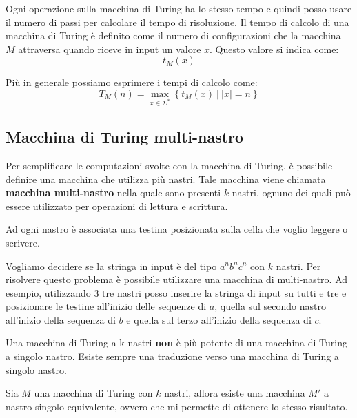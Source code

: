 Ogni operazione sulla macchina di Turing ha lo stesso tempo e quindi posso usare 
il numero di passi per calcolare il tempo di risoluzione. Il tempo di calcolo di 
una macchina di Turing è definito come il numero di configurazioni che la macchina
 $M$ attraversa quando riceve in input un valore $x$. Questo valore si indica come: 
\begin{equation}
    t_M(x)
\end{equation}

Più in generale possiamo esprimere i tempi di calcolo come:
\begin{equation}
    T_M(n) = \max_{x \in \Sigma^{\ast}} \left\{t_M(x) \ | \ |x| = n \right\}
\end{equation}
\subsection{Macchina di Turing multi-nastro}
Per semplificare le computazioni svolte con la macchina di Turing, è possibile 
definire una macchina che utilizza più nastri. Tale macchina viene chiamata 
\textbf{macchina multi-nastro} nella quale sono presenti $k$ nastri, ognuno dei 
quali può essere utilizzato per operazioni di lettura e scrittura.

Ad ogni nastro è associata una testina posizionata sulla cella che voglio leggere 
o scrivere. 

\begin{esempio} 
    Vogliamo decidere se la stringa in input è del tipo $a^nb^nc^n$ con $k$ nastri.
     Per risolvere questo problema è possibile utilizzare una macchina di multi-nastro. 
     Ad esempio, utilizzando 3 tre nastri posso inserire la stringa di input su tutti 
     e tre e posizionare le testine all'inizio delle sequenze di $a$, quella sul 
     secondo nastro all'inizio della sequenza di $b$ e quella sul terzo all'inizio 
     della sequenza di $c$.
\end{esempio}

Una macchina di Turing a k nastri \textbf{non} è più potente di una macchina di Turing 
a singolo nastro. Esiste sempre una traduzione verso una macchina di Turing a singolo nastro.
\begin{teorema}
    Sia $M$ una macchina di Turing con $k$ nastri, allora esiste una macchina $M'$ 
    a nastro singolo equivalente, ovvero che mi permette di ottenere lo stesso risultato.
\end{teorema}

